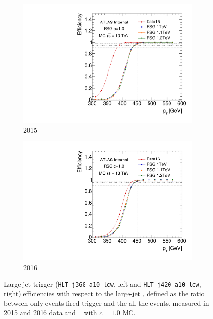 \begin{figure}[htbp!]
    \captionsetup{justification=centering}
    \begin{subfigure}[b]{0.45\textwidth}
        \includegraphics[width=\textwidth,angle=-90]{figures/boosted/Trigger/trig_15_b77_pT_Efficiency.pdf}
        \caption{2015}
        \label{fig:boosted-trigger-HLT-turnon-2015}
    \end{subfigure}
    \quad
    \begin{subfigure}[b]{0.45\textwidth}
        \includegraphics[width=\textwidth,angle=-90]{figures/boosted/Trigger/trig_16_b77_pT_Efficiency.pdf}
        \caption{2016}
        \label{fig:boosted-trigger-HLT-turnon-2016}
    \end{subfigure}
  \caption{Large-\R jet trigger (\texttt{HLT\_j360\_a10\_lcw}, left and \texttt{HLT\_j420\_a10\_lcw}, right) efficiencies with respect to the large-\R jet \pt, defined as the ratio between only events fired trigger and the all the events, measured in 2015 and 2016 data and \Grav~ with $c=1.0$ MC.}
  \label{fig:boosted-trigger-HLT-turnon}
\end{figure}


